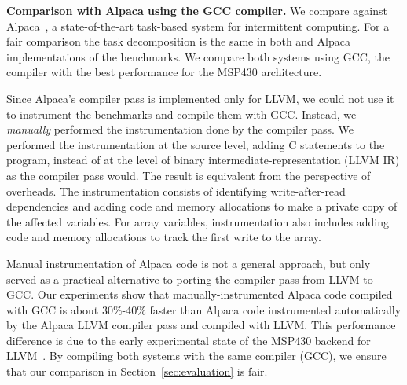 
\textbf{Comparison with Alpaca using the GCC compiler.} We compare
\sys against Alpaca~\cite{alpaca}, a state-of-the-art task-based system for
intermittent computing. For a fair comparison the task decomposition is the
same in both \sys and Alpaca implementations of the benchmarks. We compare
both systems using GCC, the compiler with the best performance for the
MSP430 architecture.

Since Alpaca's compiler pass is implemented only for LLVM, we could not use it
to instrument the benchmarks and compile them with GCC. Instead, we
\emph{manually} performed the instrumentation done by the compiler pass.
We performed the instrumentation at the source level, adding C
statements to the program, instead of at the level of binary
intermediate-representation (LLVM IR) as the compiler pass would. The result is
equivalent from the perspective of overheads. The
instrumentation consists of identifying write-after-read dependencies and
adding code and memory allocations to make a private copy of the
affected variables. For array variables, instrumentation also includes adding
code and memory allocations to track the first write to the array.

Manual instrumentation of Alpaca code is not a general approach, but only
served as a practical alternative to porting the compiler pass from LLVM to
GCC.
%
Our experiments show that manually-instrumented Alpaca code compiled with GCC
is about 30\%-40\% faster than Alpaca code instrumented automatically by the
Alpaca LLVM compiler pass and compiled with LLVM. This performance difference
is due to the early experimental state of the MSP430 backend for
LLVM~\cite{baghsorkhi_cgo_2018}.
%
By compiling both systems with the same compiler (GCC), we ensure that our
comparison in Section~\ref{sec:evaluation} is fair.

